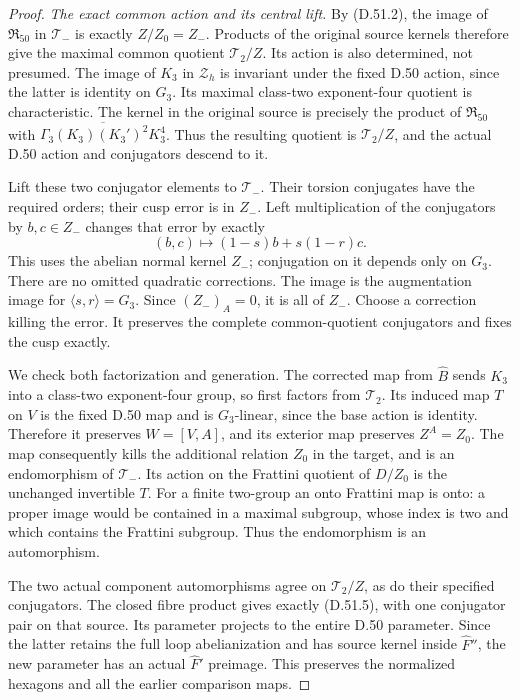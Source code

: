 \begin{proof}
\emph{The exact common action and its central lift.}
By (D.51.2), the image of \(\mathfrak R_{50}\)
in \(\mathcal T_-\) is exactly \(Z/Z_0=Z_-\).
Products of the original source kernels therefore
give the maximal common quotient
\(\mathcal T_2/Z\).
Its action is also determined, not presumed.
The image of \(K_3\) in \(\mathcal Z_h\) is
invariant under the fixed D.50 action, since
the latter is identity on \(G_3\).
Its maximal class-two exponent-four quotient
is characteristic. The kernel in the original
source is precisely the product of
\(\mathfrak R_{50}\) with
\(\overline{\Gamma_3(K_3)(K_3')^2K_3^4}\).
Thus the resulting quotient is
\(\mathcal T_2/Z\), and the actual D.50
action and conjugators descend to it.

Lift these two conjugator elements to
\(\mathcal T_-\). Their torsion conjugates
have the required orders; their cusp error
is in \(Z_-\). Left multiplication of the
conjugators by \(b,c\in Z_-\) changes that
error by exactly
\[
             (b,c)\longmapsto
                    (1-s)b+s(1-r)c .
 \tag{D.51.15}
\]
This uses the abelian normal kernel \(Z_-\);
conjugation on it depends only on \(G_3\).
There are no omitted quadratic corrections.
The image is the augmentation image for
\(\langle s,r\rangle=G_3\). Since
\((Z_-)_A=0\), it is all of \(Z_-\).
Choose a correction killing the error.
It preserves the complete common-quotient
conjugators and fixes the cusp exactly.

We check both factorization and generation.
The corrected map from \(\widehat B\) sends
\(K_3\) into a class-two exponent-four group,
so first factors from \(\mathcal T_2\).
Its induced map \(T\) on \(V\) is the fixed
D.50 map and is \(G_3\)-linear, since the
base action is identity. Therefore it preserves
\(W=[V,A]\), and its exterior map preserves
\(Z^A=Z_0\). The map consequently kills
the additional relation \(Z_0\) in the target,
and is an endomorphism of \(\mathcal T_-\).
Its action on the Frattini quotient of
\(D/Z_0\) is the unchanged invertible \(T\).
For a finite two-group an onto Frattini map
is onto: a proper image would be contained
in a maximal subgroup, whose index is two
and which contains the Frattini subgroup.
Thus the endomorphism is an automorphism.

The two actual component automorphisms agree
on \(\mathcal T_2/Z\), as do their specified
conjugators. The closed fibre product gives
exactly (D.51.5), with one conjugator pair
on that source. Its parameter projects to
the entire D.50 parameter. Since the latter
retains the full loop abelianization and
has source kernel inside \(\widehat F''\),
the new parameter has an actual
\(\widehat F'\) preimage. This preserves
the normalized hexagons and all the earlier
comparison maps.


\end{proof}
